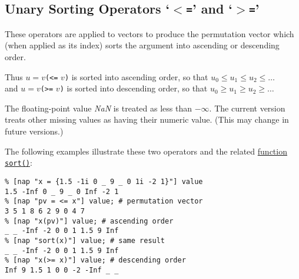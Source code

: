   \subsection{
    \label{Sorting} Unary Sorting Operators `\texttt{$<$=}' and `\texttt{$>$=}'
  }
These operators are applied to vectors to produce the
  permutation vector which (when applied as its index) sorts the
  argument into ascending or descending order.
  \par Thus 
  $u = v$\texttt{(<=} $v$\texttt{)} 
  is sorted into ascending order, so that 
  $u_0 \le u_1 \le u_2 \le \ldots$
  \\
  and 
  $u = v$\texttt{(>=} $v$\texttt{)} 
  is sorted into descending order, so that 
  $u_0 \ge u_1 \ge u_2 \ge \ldots$
  \par The floating-point value 
  \textit{NaN} is treated as less than $-\infty$.
  The current
  version treats other missing values as having their numeric value.
  (This may change in future versions.)
  \par The following examples illustrate these two operators and the
  related 
  \href{function.html\#change:shape:or:order}{function \texttt{sort()}}:
  \begin{verbatim}
% [nap "x = {1.5 -1i 0 _ 9 _ 0 1i -2 1}"] value
1.5 -Inf 0 _ 9 _ 0 Inf -2 1
% [nap "pv = <= x"] value; # permutation vector
3 5 1 8 6 2 9 0 4 7
% [nap "x(pv)"] value; # ascending order
_ _ -Inf -2 0 0 1 1.5 9 Inf
% [nap "sort(x)"] value; # same result
_ _ -Inf -2 0 0 1 1.5 9 Inf
% [nap "x(>= x)"] value; # descending order
Inf 9 1.5 1 0 0 -2 -Inf _ _
\end{verbatim}

